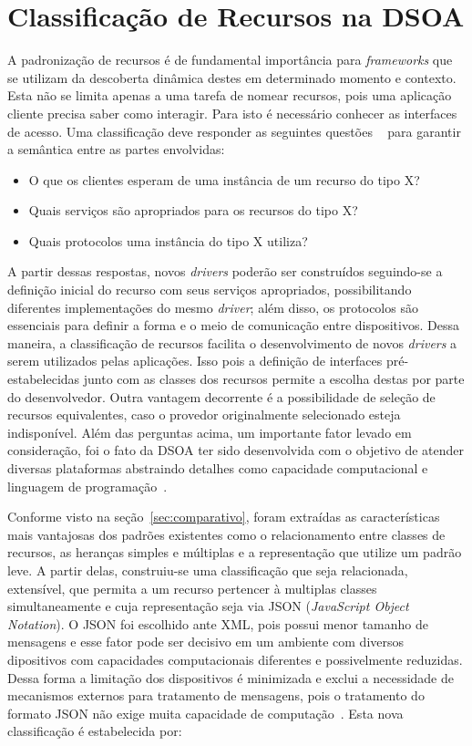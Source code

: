 \chapter{Classificação de Recursos na DSOA}
\label{cap:proposta}

A padronização de recursos é de fundamental importância para \emph{frameworks} que se utilizam da descoberta dinâmica destes em determinado momento e contexto. Esta não se limita apenas a uma tarefa de nomear recursos, pois uma aplicação cliente precisa saber como interagir. Para isto é necessário conhecer as interfaces de acesso. Uma classificação deve responder as seguintes questões ~\cite{pervasiveComputing} para garantir a semântica entre as partes envolvidas:

\begin{itemize}
	\item O que os clientes esperam de uma instância de um recurso do tipo X?

	\item Quais serviços são apropriados para os recursos do tipo X?

	\item Quais protocolos uma instância do tipo X utiliza?
\end{itemize}

A partir dessas respostas, novos \emph{drivers} poderão ser construídos seguindo-se a definição inicial do recurso com seus serviços apropriados, possibilitando diferentes implementações do mesmo \emph{driver}; além disso, os protocolos são essenciais para definir a forma e o meio de comunicação entre dispositivos. Dessa maneira, a classificação de recursos facilita o desenvolvimento de novos \emph{drivers} a serem utilizados pelas aplicações. Isso pois a definição de interfaces pré-estabelecidas junto com as classes dos recursos permite a escolha destas por parte do desenvolvedor. Outra vantagem decorrente é a possibilidade de seleção de recursos equivalentes, caso o provedor originalmente selecionado esteja indisponível. Além das perguntas acima, um importante fator levado em consideração, foi o fato da DSOA ter sido desenvolvida com o objetivo de atender diversas plataformas abstraindo detalhes como capacidade computacional e linguagem de programação~\cite{buzetoDSOA2010}.

Conforme visto na seção~\ref{sec:comparativo}, foram extraídas as características mais vantajosas dos padrões existentes como o relacionamento entre classes de recursos, as heranças simples e múltiplas e a representação que utilize um padrão leve. A partir delas, construiu-se uma classificação que seja relacionada, extensível, que permita a um recurso pertencer à multiplas classes simultaneamente e cuja representação seja via JSON (\emph{JavaScript Object Notation}). O JSON foi escolhido ante XML, pois possui menor tamanho de mensagens e esse fator pode ser decisivo em um ambiente com diversos dipositivos com capacidades computacionais diferentes e possivelmente reduzidas. Dessa forma a limitação dos dispositivos é minimizada e exclui a necessidade de mecanismos externos para tratamento de mensagens, pois o tratamento do formato JSON não exige muita capacidade de computação~\cite{comparativojson}. Esta nova classificação é estabelecida por:

